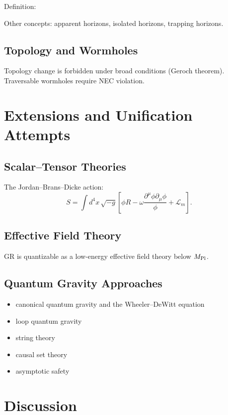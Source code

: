 \documentclass[12pt]{article}
\begin{document}
Definition:
\[
\]

Other concepts: apparent horizons, isolated horizons, trapping horizons.

\subsection{Topology and Wormholes}

Topology change is forbidden under broad conditions (Geroch theorem).
Traversable wormholes require NEC violation.

\section{Extensions and Unification Attempts}

\subsection{Scalar--Tensor Theories}

The Jordan--Brans--Dicke action:
\[
S = \int d^4x\, \sqrt{-g}\left[
\phi R - \omega \frac{\partial^\mu\phi \partial_\mu\phi}{\phi}
+ \mathcal{L}_m
\right].
\]

\subsection{Effective Field Theory}

GR is quantizable as a low-energy effective field theory below $M_{\rm Pl}$.

\subsection{Quantum Gravity Approaches}

\begin{itemize}
\item canonical quantum gravity and the Wheeler--DeWitt equation
\item loop quantum gravity
\item string theory
\item causal set theory
\item asymptotic safety
\end{itemize}

\section{Discussion}
\end{document}
